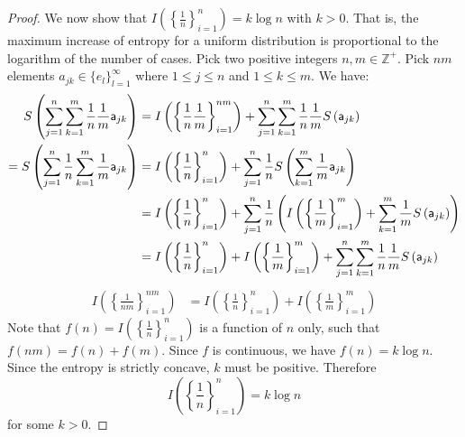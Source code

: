 \begin{proof}
	We now show that $I\left(\left\{\frac{1}{n}\right\}_{i=1}^{n}\right) = k \log n$ with $k > 0$. That is, the maximum increase of entropy for a uniform distribution is proportional to the logarithm of the number of cases. Pick two positive integers $n, m \in \mathbb{Z}^+$. Pick $nm$ elements $a_{jk} \in \{e_l\}_{l=1}^{\infty}$ where $1\leq j \leq n$ and $1 \leq  k \leq m$. We have:
	\begin{equation}
		\begin{aligned}
			S\left(\sum_{j=1}^{n}\sum_{k=1}^{m} \frac{1}{n}\frac{1}{m} \ens[a]_{jk}\right) &= I\left(\left\{ \frac{1}{n}\frac{1}{m}\right\}_{i=1}^{nm}\right) + \sum_{j=1}^{n}\sum_{k=1}^{m} \frac{1}{n}\frac{1}{m} S\left(\ens[a]_{jk}\right) \\
			= S\left(\sum_{j=1}^{n} \frac{1}{n} \sum_{k=1}^{m} \frac{1}{m} \ens[a]_{jk}\right)  &=I\left(\left\{ \frac{1}{n}\right\}_{i=1}^{n}\right) + \sum_{j=1}^{n} \frac{1}{n} S\left(\sum_{k=1}^{m}\frac{1}{m}\ens[a]_{jk}\right) \\
			&=I\left(\left\{ \frac{1}{n}\right\}_{i=1}^{n}\right) + \sum_{j=1}^{n} \frac{1}{n}\left(I\left(\left\{ \frac{1}{m}\right\}_{i=1}^{m}\right) +  \sum_{k=1}^{m}\frac{1}{m}S\left(\ens[a]_{jk}\right)\right) \\
			&=I\left(\left\{ \frac{1}{n}\right\}_{i=1}^{n}\right) + I\left(\left\{ \frac{1}{m}\right\}_{i=1}^{m}\right) + \sum_{j=1}^{n} \sum_{k=1}^{m}\frac{1}{n}\frac{1}{m}S\left(\ens[a]_{jk}\right)
		\end{aligned}
	\end{equation}
	\begin{equation}
		\begin{aligned}
			I\left(\left\{ \frac{1}{nm}\right\}_{i=1}^{nm}\right) &=I\left(\left\{ \frac{1}{n}\right\}_{i=1}^{n}\right) + I\left(\left\{ \frac{1}{m}\right\}_{i=1}^{m}\right)
		\end{aligned}
	\end{equation}
	Note that $f(n) = I\left(\left\{ \frac{1}{n}\right\}_{i=1}^{n}\right)$ is a function of $n$ only, such that $f(nm) = f(n) + f(m)$. Since $f$ is continuous, we have $f(n) = k \log n$. Since the entropy is strictly concave, $k$ must be positive. Therefore
	\begin{equation}
		I\left(\left\{ \frac{1}{n}\right\}_{i=1}^{n}\right) = k \log n
	\end{equation}
	for some $k>0$.
	

\end{proof}
